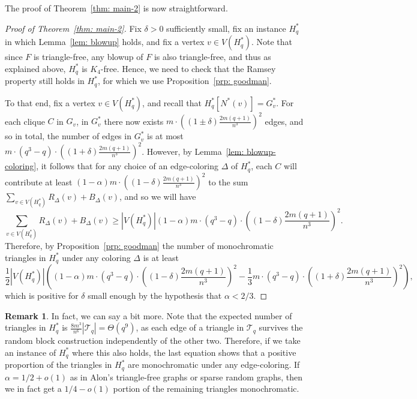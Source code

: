 \documentclass[A4paper,reqno,oneside,12pt]{amsart}
\theoremstyle{plain}
\theoremstyle{definition}
\newtheorem*{remark*}{Remark}
\newcommand{\scT}{\mathscr{T}}
\def\a{\alpha}
\def\d{\delta}
\begin{document}
The proof of Theorem~\ref{thm: main-2} is now straightforward.

\begin{proof}[Proof of Theorem~\ref{thm: main-2}]
Fix $\d > 0$ sufficiently small, fix an instance $H_q^*$ in which Lemma~\ref{lem: blowup} holds, and fix a vertex $v \in V(H_q^*)$.
Note that since $F$ is triangle-free, any blowup of $F$ is also triangle-free, and thus as explained above, $H_q^*$ is $K_4$-free.
Hence, we need to check that the Ramsey property still holds in $H_q^*$, for which we use Proposition~\ref{prp: goodman}.

To that end, fix 
a vertex $v \in V(H_q^*)$, and recall that $H_q^*[N^*(v)] = G_v^*$.
For each clique $C$ in $G_v$, in $G_v^*$ there now exists $m \cdot \left((1\pm\d)\frac{2m(q+1)}{n^3}\right)^2$ edges, and so in total, the number of edges in $G_v^*$ is at most $m \cdot (q^3-q) \cdot \left((1+\d)\frac{2m(q+1)}{n^3}\right)^2$.
However, by Lemma~\ref{lem: blowup-coloring}, it follows that for any choice of an edge-coloring $\Delta$ of $H_q^*$, each $C$ will contribute at least 
$(1 - \a) m \cdot \left((1-\d)\frac{2m(q+1)}{n^3}\right)^2$
to the sum $\sum_{v \in V(H_q^*)} R_\Delta(v) + B_\Delta(v)$, 
and so
we will have
\begin{equation*}
    \sum_{v \in V(H_q^*)} R_\Delta(v) + B_\Delta(v) \geq |V(H_q^*)|(1-\a) m \cdot (q^3-q) \cdot \left((1-\d)\frac{2m(q+1)}{n^3}\right)^2.
\end{equation*}
Therefore, by Proposition~\ref{prp: goodman} the number of monochromatic triangles in $H_q^*$ under any coloring $\Delta$ is at least
\begin{equation*}
    \frac{1}{2}|V(H_q^*)| \left( \left(1-\a\right) m \cdot (q^3-q) \cdot \left((1-\d)\frac{2m(q+1)}{n^3}\right)^2 - \frac{1}{3} m \cdot (q^3-q) \cdot \left((1+\d)\frac{2m(q+1)}{n^3}\right)^2 \right),
\end{equation*}
which is positive for $\d$ small enough by the hypothesis that $\a < 2/3$.
\end{proof}

\begin{remark*}
    In fact, we can say a bit more. 
    Note that the expected number of triangles in $H_q^*$ is $\frac{8m^3}{n^6} |\scT_q| = \Theta(q^9)$, as each edge of a triangle in $\scT_q$ survives the random block construction independently of the other two.
    Therefore, if we take an instance of $H_q^*$ where this also holds, the last equation shows that a positive proportion of the triangles in $H_q^*$ are monochromatic under any edge-coloring.
    If $\a = 1/2+o(1)$ as in Alon's triangle-free graphs or sparse random graphs, then we in fact get a $1/4-o(1)$ portion of the remaining triangles monochromatic.
\end{remark*}
\end{document}
